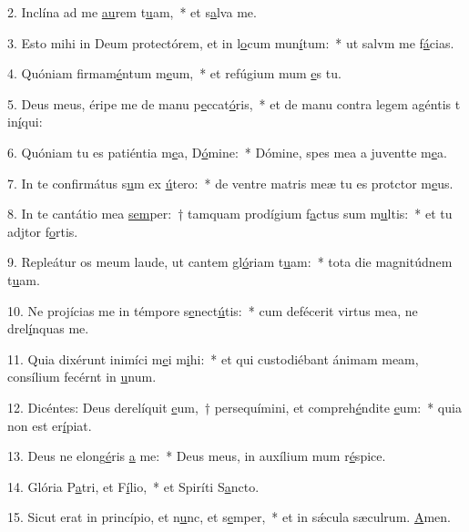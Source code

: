 2. Inclína ad me \uline{au}rem t\uline{u}am,~* et s\uline{a}lva me.\par 
3. Esto mihi in Deum protectórem, et in l\uline{o}cum mun\uline{í}tum:~* ut salvm me f\uline{á}cias.\par 
4. Quóniam firmam\uline{é}ntum m\uline{e}um,~* et refúgium mum \uline{e}s tu.\par 
5. Deus meus, éripe me de manu p\uline{e}ccat\uline{ó}ris,~* et de manu contra legem agéntis t in\uline{í}qui:\par 
6. Quóniam tu es patiéntia m\uline{e}a, D\uline{ó}mine:~* Dómine, spes mea a juventte m\uline{e}a.\par 
7. In te confirmátus s\uline{u}m ex \uline{ú}tero:~* de ventre matris meæ tu es protctor m\uline{e}us.\par 
8. In te cantátio mea \uline{sem}per:~† tamquam prodígium f\uline{a}ctus sum m\uline{u}ltis:~* et tu adjtor f\uline{o}rtis.\par 
9. Repleátur os meum laude, ut cantem gl\uline{ó}riam t\uline{u}am:~* tota die magnitúdnem t\uline{u}am.\par 
10. Ne projícias me in témpore s\uline{e}nect\uline{ú}tis:~* cum defécerit virtus mea, ne drel\uline{í}nquas me.\par 
11. Quia dixérunt inimíci m\uline{e}i m\uline{i}hi:~* et qui custodiébant ánimam meam, consílium fecérnt in \uline{u}num.\par 
12. Dicéntes: Deus derelíquit \uline{e}um,~† persequímini, et compreh\uline{é}ndite \uline{e}um:~* quia non est  er\uline{í}piat.\par 
13. Deus ne elong\uline{é}ris \uline{a} me:~* Deus meus, in auxílium mum r\uline{é}spice.\par 
14. Glória P\uline{a}tri, et F\uline{í}lio,~* et Spiríti S\uline{a}ncto.\par 
15. Sicut erat in princípio, et n\uline{u}nc, et s\uline{e}mper,~* et in sǽcula sæculrum. \uline{A}men.\par 
